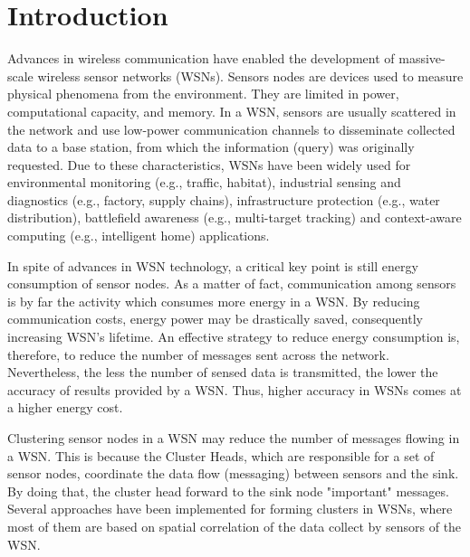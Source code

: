 \documentclass{acm_proc_article-sp}
\begin{document}






\section{Introduction}

Advances in wireless communication have enabled the development of massive-scale
wireless sensor networks (WSNs). Sensors nodes are devices used to measure
physical phenomena from the environment. They are limited in power,
computational capacity, and memory. In a WSN, sensors are usually scattered in
the network and use low-power communication channels to disseminate collected
data to a base station, from which the information (query) was originally
requested. Due to these characteristics, WSNs have been widely used for
environmental monitoring (e.g., traffic, habitat), industrial sensing and
diagnostics (e.g., factory, supply chains), infrastructure protection (e.g.,
water distribution), battlefield awareness (e.g., multi-target tracking) and
context-aware computing (e.g., intelligent home) applications.
\vspace*{-.3cm}

In spite of advances in WSN technology, a critical key point is still 
energy consumption of sensor nodes. As a matter of fact, communication among
sensors is by far the activity which consumes more energy in a WSN. By
reducing communication costs, energy power may be drastically saved, consequently
increasing WSN's lifetime. An effective strategy to reduce energy consumption is, therefore, to reduce the number of messages sent
across the network. Nevertheless, the less the number of sensed data is transmitted,
the lower the accuracy of results provided by a WSN. Thus, higher accuracy in
WSNs comes at a higher energy cost.
\vspace*{-.3cm}

Clustering sensor nodes in a WSN may reduce the number of messages flowing in a WSN. This is because the Cluster Heads, which are responsible for a set of sensor nodes, coordinate the data flow (messaging) between sensors and the sink. By doing that, the cluster head forward to the sink node "important" messages. Several approaches have been implemented for forming clusters in WSNs, where most of them are based on spatial correlation of the data collect by sensors of the WSN.
\end{document}
